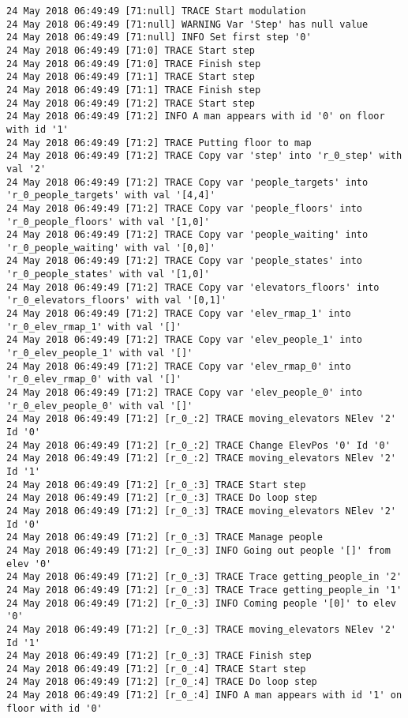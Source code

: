\begin{lstlisting}
24 May 2018 06:49:49 [71:null] TRACE Start modulation
24 May 2018 06:49:49 [71:null] WARNING Var 'Step' has null value
24 May 2018 06:49:49 [71:null] INFO Set first step '0'
24 May 2018 06:49:49 [71:0] TRACE Start step
24 May 2018 06:49:49 [71:0] TRACE Finish step
24 May 2018 06:49:49 [71:1] TRACE Start step
24 May 2018 06:49:49 [71:1] TRACE Finish step
24 May 2018 06:49:49 [71:2] TRACE Start step
24 May 2018 06:49:49 [71:2] INFO A man appears with id '0' on floor with id '1'
24 May 2018 06:49:49 [71:2] TRACE Putting floor to map
24 May 2018 06:49:49 [71:2] TRACE Copy var 'step' into 'r_0_step' with val '2'
24 May 2018 06:49:49 [71:2] TRACE Copy var 'people_targets' into 'r_0_people_targets' with val '[4,4]'
24 May 2018 06:49:49 [71:2] TRACE Copy var 'people_floors' into 'r_0_people_floors' with val '[1,0]'
24 May 2018 06:49:49 [71:2] TRACE Copy var 'people_waiting' into 'r_0_people_waiting' with val '[0,0]'
24 May 2018 06:49:49 [71:2] TRACE Copy var 'people_states' into 'r_0_people_states' with val '[1,0]'
24 May 2018 06:49:49 [71:2] TRACE Copy var 'elevators_floors' into 'r_0_elevators_floors' with val '[0,1]'
24 May 2018 06:49:49 [71:2] TRACE Copy var 'elev_rmap_1' into 'r_0_elev_rmap_1' with val '[]'
24 May 2018 06:49:49 [71:2] TRACE Copy var 'elev_people_1' into 'r_0_elev_people_1' with val '[]'
24 May 2018 06:49:49 [71:2] TRACE Copy var 'elev_rmap_0' into 'r_0_elev_rmap_0' with val '[]'
24 May 2018 06:49:49 [71:2] TRACE Copy var 'elev_people_0' into 'r_0_elev_people_0' with val '[]'
24 May 2018 06:49:49 [71:2] [r_0_:2] TRACE moving_elevators NElev '2' Id '0'
24 May 2018 06:49:49 [71:2] [r_0_:2] TRACE Change ElevPos '0' Id '0'
24 May 2018 06:49:49 [71:2] [r_0_:2] TRACE moving_elevators NElev '2' Id '1'
24 May 2018 06:49:49 [71:2] [r_0_:3] TRACE Start step
24 May 2018 06:49:49 [71:2] [r_0_:3] TRACE Do loop step
24 May 2018 06:49:49 [71:2] [r_0_:3] TRACE moving_elevators NElev '2' Id '0'
24 May 2018 06:49:49 [71:2] [r_0_:3] TRACE Manage people
24 May 2018 06:49:49 [71:2] [r_0_:3] INFO Going out people '[]' from elev '0'
24 May 2018 06:49:49 [71:2] [r_0_:3] TRACE Trace getting_people_in '2'
24 May 2018 06:49:49 [71:2] [r_0_:3] TRACE Trace getting_people_in '1'
24 May 2018 06:49:49 [71:2] [r_0_:3] INFO Coming people '[0]' to elev '0'
24 May 2018 06:49:49 [71:2] [r_0_:3] TRACE moving_elevators NElev '2' Id '1'
24 May 2018 06:49:49 [71:2] [r_0_:3] TRACE Finish step
24 May 2018 06:49:49 [71:2] [r_0_:4] TRACE Start step
24 May 2018 06:49:49 [71:2] [r_0_:4] TRACE Do loop step
24 May 2018 06:49:49 [71:2] [r_0_:4] INFO A man appears with id '1' on floor with id '0'

\end{lstlisting}
